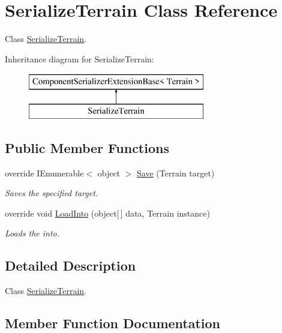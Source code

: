 \hypertarget{class_serialize_terrain}{}\section{Serialize\+Terrain Class Reference}
\label{class_serialize_terrain}


Class \hyperlink{class_serialize_terrain}{Serialize\+Terrain}.  


Inheritance diagram for Serialize\+Terrain\+:\begin{figure}[H]
\begin{center}
\leavevmode
\includegraphics[height=2.000000cm]{class_serialize_terrain}
\end{center}
\end{figure}
\subsection*{Public Member Functions}
\begin{DoxyCompactItemize}
\item 
override I\+Enumerable$<$ object $>$ \hyperlink{class_serialize_terrain_aab7a541af72244820a5b2231dec7a4dd}{Save} (Terrain target)
\begin{DoxyCompactList}\small\item\em Saves the specified target. \end{DoxyCompactList}\item 
override void \hyperlink{class_serialize_terrain_ae48128e79b26ed6508af94b865005290}{Load\+Into} (object\mbox{[}$\,$\mbox{]} data, Terrain instance)
\begin{DoxyCompactList}\small\item\em Loads the into. \end{DoxyCompactList}\end{DoxyCompactItemize}


\subsection{Detailed Description}
Class \hyperlink{class_serialize_terrain}{Serialize\+Terrain}. 



\subsection{Member Function Documentation}
\mbox{\label{class_serialize_terrain_ae48128e79b26ed6508af94b865005290}} 

